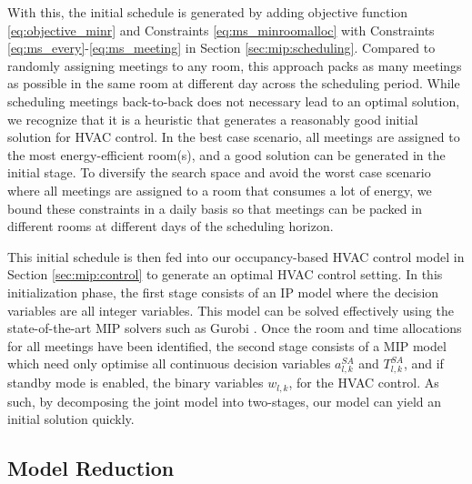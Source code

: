 
With this, the initial schedule is generated by adding objective function \eqref{eq:objective_minr} and Constraints \eqref{eq:ms_minroomalloc} with Constraints \eqref{eq:ms_every}-\eqref{eq:ms_meeting} in Section \ref{sec:mip:scheduling}. Compared to randomly assigning meetings to any room, this approach packs as many meetings as possible in the same room at different day across the scheduling period. While scheduling meetings back-to-back does not necessary lead to an optimal solution, we recognize that it is a heuristic that generates a reasonably good initial solution for HVAC control. In the best case scenario, all meetings are assigned to the most energy-efficient room(s), and a good solution can be generated in the initial stage. To diversify the search space and avoid the worst case scenario where all meetings are assigned to a room that consumes a lot of energy, we bound these constraints in a daily basis so that meetings can be packed in different rooms at different days of the scheduling horizon. 

This initial schedule is then fed into our occupancy-based HVAC control model in Section \ref{sec:mip:control} to generate an optimal HVAC control setting. In this initialization phase, the first stage consists of an IP model where the decision variables are all integer variables. This model can be solved effectively using the state-of-the-art MIP solvers such as Gurobi \citep{gurobi}. 
Once the room and time allocations for all meetings have been identified, the second stage consists of a MIP model which need only optimise all continuous decision variables $a^{SA}_{l,k}$ and $T^{SA}_{l,k}$, and if standby mode is enabled, the binary variables $w_{l,k}$, for the HVAC control. As such, by decomposing the joint model into two-stages, our model can yield an initial solution quickly. 


\subsection{Model Reduction}

